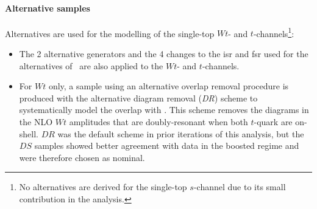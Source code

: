 \paragraph{Alternative samples} Alternatives are used for the modelling of the single-top $Wt$- and $t$-channels\footnote{No alternatives are derived for the single-top $s$-channel due to its small contribution in the analysis.}:
\begin{itemize}
  \item The 2 alternative generators and the 4 changes to the \gls{isr} and \gls{fsr} used for the alternatives of \ttb\ are also applied to the $Wt$- and $t$-channels.
  \item For $Wt$ only, a sample using an alternative overlap removal procedure is produced with the alternative diagram removal (\textit{DR}) scheme \cite{StefanoFrixione_2008} to systematically model the overlap with \ttb. This scheme removes the diagrams in the NLO $Wt$ amplitudes that are doubly-resonant when both $t$-quark are on-shell. $DR$ was the default scheme in prior iterations of this analysis, but the $DS$ samples showed better agreement with data in the boosted regime and were therefore chosen as nominal.
\end{itemize}

